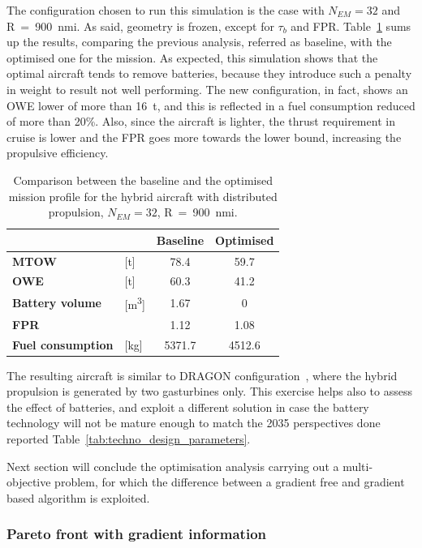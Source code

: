 The configuration chosen to run this simulation is the case with $N_{EM}=32$ and R~=~900~nmi. 
As said, geometry is frozen, except for $\tau_{b}$ and FPR.
Table~\ref{tab:hybrid_dep_optim_no_batt_comp} sums up the results, comparing the previous analysis, referred as baseline, with the optimised one for the mission. 
As expected, this simulation shows that the optimal aircraft tends to remove batteries, because they introduce such a penalty in weight to result not well performing.
The new configuration, in fact, shows an OWE lower of more than 16~\si{\tonne}, and this is reflected in a fuel consumption reduced of more than 20\%.
Also, since the aircraft is lighter, the thrust requirement in cruise is lower and the FPR goes more towards the lower bound, increasing the propulsive efficiency. 
\begin{table}[!h]
	\centering
	\begin{tabular}{l l c c}
		\cline{3-4}
		& & \textbf{Baseline} & \textbf{Optimised} \\
		\hline
		\textbf{MTOW} & [\si{\tonne}] & 78.4 & 59.7 \\
		\textbf{OWE} & [\si{\tonne}] & 60.3 & 41.2 \\
		\textbf{Battery volume} & [\si{\cubic\meter}] & 1.67 & 0 \\
		\textbf{FPR} & & 1.12 & 1.08 \\
		\textbf{Fuel consumption} & [\si{\kilogram}] & 5371.7 & 4512.6 \\
		\hline 
	\end{tabular}
	\caption{Comparison between the baseline and the optimised mission profile for the hybrid aircraft with distributed propulsion, $N_{EM}=32$, R~=~900~nmi.}
	\label{tab:hybrid_dep_optim_no_batt_comp}
\end{table}

The resulting aircraft is similar to DRAGON configuration~\cite{bib:dragon}, where the hybrid propulsion is generated by two gasturbines only. 
This exercise helps also to assess the effect of batteries, and exploit a different solution in case the battery technology will not be mature enough to match the 2035 perspectives done reported Table~\ref{tab:techno_design_parameters}.

Next section will conclude the optimisation analysis carrying out a multi-objective problem, for which the difference between a gradient free and gradient based algorithm is exploited. 

\subsubsection{Pareto front with gradient information}
\label{subsubsec:chap3_hybrid_pareto}

